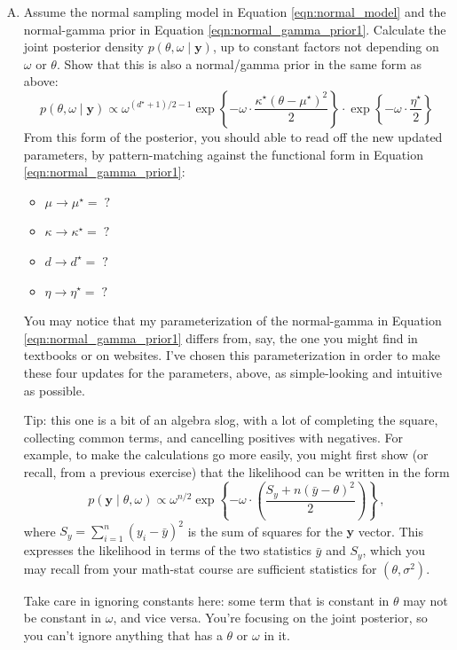 \documentclass[11pt]{article}
\newcommand{\by}{\textbf{y}}
\begin{document}
\begin{enumerate}[(A)]
\item Assume the normal sampling model in Equation \ref{eqn:normal_model} and the normal-gamma prior in Equation \ref{eqn:normal_gamma_prior1}.  Calculate the joint posterior density $p(\theta, \omega \mid \textbf{y})$, up to constant factors not depending on $\omega$ or $\theta$.  Show that this is also a normal/gamma prior in the same form as above:
\begin{equation}
\label{eqn:normal_gamma_post}
p(\theta, \omega \mid \by) \propto \omega^{(d^\star+1)/2 - 1} \exp \left\{ - \omega \cdot \frac{\kappa^\star (\theta - \mu^\star)^2}{2}  \right\}
\cdot \exp\left\{ -  \omega \cdot \frac{\eta^\star}{2}  \right\} 
\end{equation}
From this form of the posterior, you should able to read off the new updated parameters, by pattern-matching against the functional form in Equation \ref{eqn:normal_gamma_prior1}:
\begin{itemize}
\item $\mu \longrightarrow \mu^\star =  \; ?$
\item $\kappa \longrightarrow \kappa^\star =  \; ?$
\item $d \longrightarrow d^{\star} =  \; ?$
\item $\eta \longrightarrow \eta^\star = \; ?$
\end{itemize}
You may notice that my parameterization of the normal-gamma in Equation \ref{eqn:normal_gamma_prior1} differs from, say, the one you might find in textbooks or on websites.  I've chosen this parameterization in order to make these four updates for the parameters, above, as simple-looking and intuitive as possible.


Tip: this one is a bit of an algebra slog, with a lot of completing the square, collecting common terms, and cancelling positives with negatives.  For example, to make the calculations go more easily, you might first show (or recall, from a previous exercise) that the likelihood can be written in the form
$$
p(\by \mid \theta, \omega) \propto \omega^{n/2} \exp \left\{ - \omega \cdot \left( \frac{S_y + n(\bar{y} - \theta)^2}{2} \right) \right\} \, ,
$$
where $S_y = \sum_{i=1}^n (y_i - \bar{y})^2$ is the sum of squares for the $\by$ vector.  This expresses the likelihood in terms of the two statistics $\bar{y}$ and $S_y$, which you may recall from your math-stat course are sufficient statistics for $(\theta, \sigma^2)$.

Take care in ignoring constants here: some term that is constant in $\theta$ may not be constant in $\omega$, and vice versa.  You're focusing on the joint posterior, so you can't ignore anything that has a $\theta$ or $\omega$ in it.


\end{enumerate}
\end{document}
